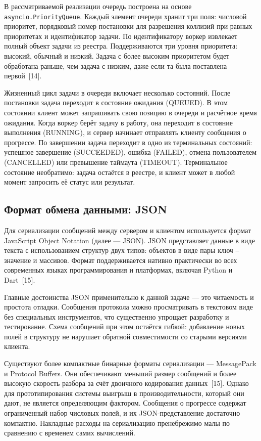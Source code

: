 \documentclass[14pt, russian]{scrartcl}
\begin{document}
В рассматриваемой реализации очередь построена на основе
\texttt{asyncio.PriorityQueue}. Каждый элемент очереди хранит три поля:
числовой приоритет, порядковый номер постановки для разрешения
коллизий при равных приоритетах и идентификатор задачи. По
идентификатору воркер извлекает полный объект задачи из реестра.
Поддерживаются три уровня приоритета: высокий, обычный и низкий.
Задача с более высоким приоритетом будет обработана раньше, чем задача
с низким, даже если та была поставлена первой~[14].

Жизненный цикл задачи в очереди включает несколько состояний.
После постановки задача переходит в состояние ожидания (QUEUED).
В этом состоянии клиент может запрашивать свою позицию в очереди и
расчётное время ожидания. Когда воркер берёт задачу в работу, она
переходит в состояние выполнения (RUNNING), и сервер начинает
отправлять клиенту сообщения о прогрессе. По завершении задача
переходит в одно из терминальных состояний: успешное завершение
(SUCCEEDED), ошибка (FAILED), отмена пользователем (CANCELLED) или
превышение таймаута (TIMEOUT). Терминальное состояние необратимо:
задача остаётся в реестре, и клиент может в любой момент запросить
её статус или результат.

\subsection{Формат обмена данными: JSON}

Для сериализации сообщений между сервером и клиентом используется формат 
JavaScript Object Notation (далее --- JSON). JSON представляет данные в виде
текста с использованием структур двух типов: объектов в виде пары ключ --
значение и массивов. Формат поддерживается нативно практически во всех
современных языках программирования и платформах, включая Python и
Dart~[15].

Главные достоинства JSON применительно к данной задаче --- это
читаемость и простота отладки. Сообщения протокола можно просматривать
в текстовом виде без специальных инструментов, что существенно упрощает
разработку и тестирование. Схема сообщений при этом остаётся гибкой:
добавление новых полей в структуру не нарушает обратной совместимости
со старыми версиями клиента.

Существуют более компактные бинарные форматы сериализации ---
MessagePack и Protocol Buffers. Они обеспечивают меньший размер
сообщений и более высокую скорость разбора за счёт двоичного
кодирования данных~[15]. Однако для прототипирования системы
выигрыш в производительности, который они дают, не является
определяющим фактором. Сообщения о прогрессе содержат ограниченный
набор числовых полей, и их JSON-представление достаточно компактно.
Накладные расходы на сериализацию пренебрежимо малы по сравнению с
временем самих вычислений.
\end{document}
